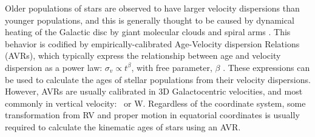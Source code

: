 Older populations of stars are observed to have larger velocity dispersions
than younger populations, and this is generally thought to be caused by
dynamical heating of the Galactic disc by giant molecular clouds and spiral
arms \citep[\eg][]{stromberg1946, wielen1977, nordstrom2004, holmberg2007,
holmberg2009, aumer2009, casagrande2011, yu2018, ting2019}.
This behavior is codified by empirically-calibrated Age-Velocity dispersion
Relations (AVRs), which typically express the relationship between age and
velocity dispersion as a power law: $\sigma_v \propto t^\beta$, with free
parameter, $\beta$ \citep[\eg][]{holmberg2009, yu2018, mackereth2019}.
These expressions can be used to calculate the ages of stellar populations
from their velocity dispersions.
However, AVRs are usually calibrated in 3D Galactocentric velocities, and most
commonly in vertical velocity: \vz\ or W.
Regardless of the coordinate system, some transformation from RV and proper
motion in equatorial coordinates is usually required to calculate the
kinematic ages of stars using an AVR.

